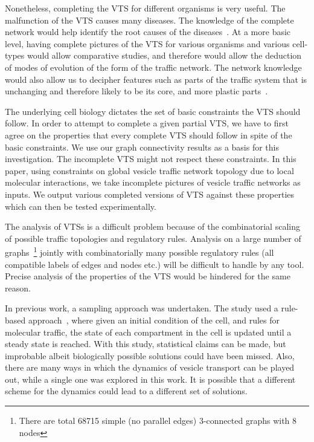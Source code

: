 Nonetheless, completing the VTS for different organisms is very useful. 
%
The malfunction of the VTS causes many diseases.
%
The knowledge of the complete network would help identify the root causes of
the diseases~\cite{bexiga2013human,gissen2007cargos}. 
%
At a more basic level, having complete pictures of the VTS for various organisms and various cell-types would allow comparative studies, and therefore would allow the deduction of modes of evolution of the form of the traffic network. 
%
The network knowledge would also allow us to decipher features such as parts of the traffic system that is unchanging and therefore likely to be its core, and more plastic parts~\cite{barlow2017seeing}.

%
The underlying cell biology dictates the set of basic constraints the VTS should follow.
%
In order to attempt to complete a given partial VTS, we have to first agree on the properties that every complete VTS should follow in spite of the basic constraints. 
%
We use our graph connectivity results as a basis for this investigation.   
%
The incomplete VTS might not respect these constraints. 
%
In this paper, using constraints on global vesicle traffic network topology due to local molecular interactions, we take incomplete pictures of vesicle traffic networks as inputs.
%
We output various completed versions of VTS against these properties which can then be tested experimentally.
%

The analysis of VTSs is a difficult problem because
of the combinatorial scaling of possible traffic topologies and
regulatory rules.
%
Analysis on a large number of graphs~\footnote{There are total 68715 simple (no parallel edges) 3-connected graphs with 8 nodes} jointly with combinatorially many possible regulatory rules (all compatible labels of edges and nodes etc.) will be difficult to handle by any tool.
%
Precise analysis of the properties of the VTS would be hindered for the same reason. 

In previous work, a sampling approach was undertaken. 
%
The study used a rule-based approach~\cite{mani2016stacking}, where given an initial condition of the cell, and rules for molecular traffic, the state of each compartment in the cell is updated until a steady state is reached. 
%
With this study, statistical claims can be made, but improbable albeit biologically possible solutions could have been missed.
%
Also, there are many ways in which the dynamics of vesicle transport can be played out, while a single one was explored in this work. 
%
It is possible that a different scheme for the dynamics could lead to a different set of solutions.

